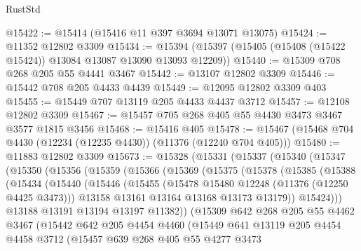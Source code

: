 \begin{lexlean}{RustStd}
\begin{coremodule}
{{{{{{{{{{{{{{{{{{{@15422 := @15414 (@15416 @11 @397 @3694 @13071 @13075)
@15424 := @11352 @12802 @3309
@15434 := @15394 (@15397 (@15405 (@15408 (@15422 @15424)) @13084 @13087 @13090 @13093 @12209))
@15440 := @15309 @708 @268 @205 @55 @4441 @3467
@15442 := @13107 @12802 @3309
@15446 := @15442 @708 @205 @4433 @4439
@15449 := @12095 @12802 @3309 @403
@15455 := @15449 @707 @13119 @205 @4433 @4437 @3712
@15457 := @12108 @12802 @3309
@15467 := @15457 @705 @268 @405 @55 @4430 @3473 @3467 @3577 @1815 @3456
@15468 := @15416 @405
@15478 := @15467 (@15468 @704 @4430 (@12234 (@12235 @4430)) (@11376 (@12240 @704 @405)))
@15480 := @11883 @12802 @3309
@15673 := @15328
    (@15331
      (@15337
        (@15340
          (@15347
            (@15350
              (@15356
                (@15359
                  (@15366
                    (@15369
                      (@15375
                        (@15378
                          (@15385
                            (@15388
                              (@15434
                                (@15440
                                  (@15446
                                    (@15455
                                      (@15478 @15480 @12248 (@11376 (@12250 @4425 @3473)))
                                      @13158
                                      @13161
                                      @13164
                                      @13168
                                      @13173
                                      @13179))
                                  @15424)))
                            @13188
                            @13191
                            @13194
                            @13197
                            @11382))
                        (@15309
                          @642
                          @268
                          @205
                          @55
                          @4462
                          @3467
                          (@15442
                            @642
                            @205
                            @4454
                            @4460
                            (@15449
                              @641
                              @13119
                              @205
                              @4454
                              @4458
                              @3712
                              (@15457
                                @639
                                @268
                                @405
                                @55
                                @4277
                                @3473
}}}}}}}}}}}}}}}}}}}
\end{coremodule}
\end{lexlean}
